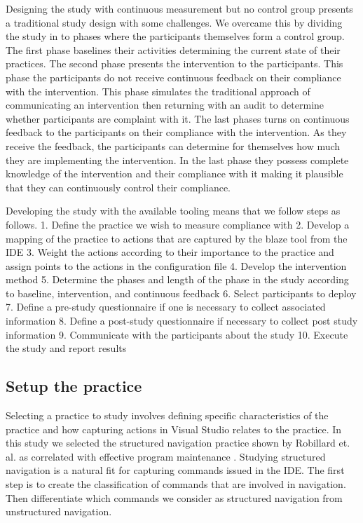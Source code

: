 \documentclass{sig-alternate}
\begin{document}
Designing the study with continuous measurement but no control group presents a traditional study design with some challenges.  We overcame this by dividing the study in to phases where the participants themselves form a control group.  The first phase baselines their activities determining the current state of their practices.  The second phase presents the intervention to the participants.  This phase the participants do not receive continuous feedback on their compliance with the intervention.  This phase simulates the traditional approach of communicating an intervention then returning with an audit to determine whether participants are complaint with it.   The last phases turns on continuous feedback to the participants on their compliance with the intervention.  As they receive the feedback, the participants can determine for themselves how much they are implementing the intervention.  In the last phase they possess complete knowledge of the intervention and their compliance with it making it plausible that they can continuously control their compliance.

Developing the study with the available tooling means that we follow steps as follows.
1. Define the practice we wish to measure compliance with
2. Develop a mapping of the practice to actions that are captured by the blaze tool from the IDE
3. Weight the actions according to their importance to the practice and assign points to the actions in the configuration file
4. Develop the intervention method
5. Determine the phases and length of the phase in the study according to baseline, intervention, and continuous feedback
6. Select participants to deploy
7. Define a pre-study questionnaire if one is necessary to collect associated information
8. Define a post-study questionnaire if necessary to collect post study information
9. Communicate with the participants about the study
10. Execute the study and report results

\subsection{Setup the practice}
Selecting a practice to study involves defining specific characteristics of the practice and how capturing actions in Visual Studio relates to the practice.  In this study we selected the structured navigation practice shown by Robillard et. al. as correlated with effective program maintenance \cite{wbsnipes:Robillard2004How} .  Studying structured navigation is a natural fit for capturing commands issued in the IDE.  The first step is to create the classification of commands that are involved in navigation.  Then differentiate which commands we consider as structured navigation from unstructured navigation.  
\end{document}
